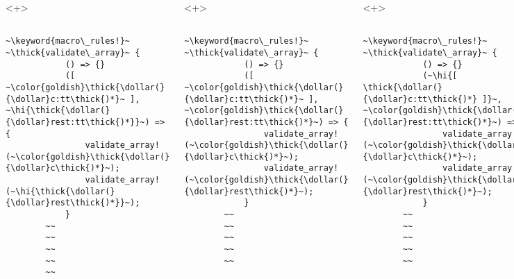 \documentclass[usepdftitle=false]{beamer}
\newcommand{\dollar}{\makebox[\widthof{\$}][c]{\$}}
\newcommand{\thick}[1]{\contourlength{0.16pt}\contour[10]{black}{#1}}
\newcommand{\hi}[1]{%
\tikz[baseline=(A.base)]
 \node[highlighting=yellowbg,inner sep=0pt,text depth=0pt] (A) {#1};%
}
\newcommand{\keyword}[1]{\color{greenish}#1}
\begin{document}
\begin{frame}[fragile]
\begin{columns}
    \begin{onlyenv}<+>
      \begin{verbatim}
        ~\keyword{macro\_rules!}~ ~\thick{validate\_array}~ {
            () => {}
            ([ ~\color{goldish}\thick{\dollar(}{\dollar}c:tt\thick{)*}~ ], ~\hi{\thick{\dollar(}{\dollar}rest:tt\thick{)*}}~) => {
                validate_array!(~\color{goldish}\thick{\dollar(}{\dollar}c\thick{)*}~);
                validate_array!(~\hi{\thick{\dollar(}{\dollar}rest\thick{)*}}~);
            }
        ~~
        ~~
        ~~
        ~~
        ~~
      \end{verbatim}
    \end{onlyenv}
    \begin{onlyenv}<+>
      \begin{verbatim}
        ~\keyword{macro\_rules!}~ ~\thick{validate\_array}~ {
            () => {}
            ([ ~\color{goldish}\thick{\dollar(}{\dollar}c:tt\thick{)*}~ ], ~\color{goldish}\thick{\dollar(}{\dollar}rest:tt\thick{)*}~) => {
                validate_array!(~\color{goldish}\thick{\dollar(}{\dollar}c\thick{)*}~);
                validate_array!(~\color{goldish}\thick{\dollar(}{\dollar}rest\thick{)*}~);
            }
        ~~
        ~~
        ~~
        ~~
        ~~
      \end{verbatim}
    \end{onlyenv}
    \begin{onlyenv}<+>
      \begin{verbatim}
        ~\keyword{macro\_rules!}~ ~\thick{validate\_array}~ {
            () => {}
            (~\hi{[ \thick{\dollar(}{\dollar}c:tt\thick{)*} ]}~, ~\color{goldish}\thick{\dollar(}{\dollar}rest:tt\thick{)*}~) => {
                validate_array!(~\color{goldish}\thick{\dollar(}{\dollar}c\thick{)*}~);
                validate_array!(~\color{goldish}\thick{\dollar(}{\dollar}rest\thick{)*}~);
            }
        ~~
        ~~
        ~~
        ~~
        ~~
      \end{verbatim}
    \end{onlyenv}
    \begin{onlyenv}<+>
      \begin{verbatim}
        ~\keyword{macro\_rules!}~ ~\thick{validate\_array}~ {
            () => {}
            ([ ~\color{goldish}\thick{\dollar(}{\dollar}c:tt\thick{)*}~ ], ~\color{goldish}\thick{\dollar(}{\dollar}rest:tt\thick{)*}~) => {
                validate_array!(~\color{goldish}\thick{\dollar(}{\dollar}c\thick{)*}~);
                validate_array!(~\color{goldish}\thick{\dollar(}{\dollar}rest\thick{)*}~);

\end{verbatim}
\end{onlyenv}
\end{columns}
\end{frame}
\end{document}
